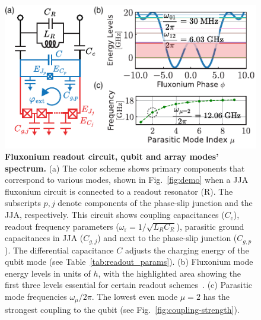 \documentclass[%
reprint,
superscriptaddress,
 amsmath,amssymb,
 aps,
 prx,
longbibliography,
floatfix,
]{revtex4-2}
\begin{document}
\begin{figure}[t]
\centering    
\includegraphics[width=\linewidth]{Figures/Meas_Circuit.pdf}
\caption{{\bf Fluxonium readout circuit, qubit and array modes' spectrum.} (a) The color scheme shows primary components that correspond to various modes, shown in Fig.~\ref{fig:demo} when a JJA fluxonium circuit is connected to a readout resonator (R). The subscripts $p,j$ denote components of the phase-slip junction and the JJA, respectively. This circuit shows coupling capacitances ($C_\textrm{c}$), readout frequency parameters ($\omega_\textrm{r}=1/\sqrt{L_{R}C_{R}}$), parasitic ground capacitances in JJA ($C_{g,j}$) and next to the phase-slip junction ($C_{g,p}$). The differential capacitance $C$ adjusts the charging energy of the qubit mode (see Table~\ref{tab:readout_params}). (b) Fluxonium mode energy levels in units of $h$, with the highlighted area showing the first three levels essential for certain readout schemes~\cite{zhang_universal_2021}. (c) Parasitic mode frequencies $\omega_\mu/2\pi$. The lowest even mode $\mu = 2$ has the strongest coupling to the qubit (see Fig.~\ref{fig:coupling-strength}). 
}
\label{fig:meas_circuit}
\end{figure}
\end{document}
